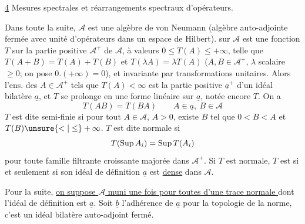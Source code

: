 \uline{4} Mesures spectrales et réarrangements spectraux d'opérateurs.

Dans toute la suite, $\mathcal A$ est une algèbre de von Neumann (algèbre auto-adjointe  fermée  avec unité d'opérateurs dans un espace de Hilbert).   sur $\mathcal A$ est une  fonction $T$ sur la partie positive $\mathcal A^+$ de $\mathcal A$, à valeurs $0\leq T(A)\leq+\infty$,  telle que $T(A+B)=T(A)+T(B)$ et $T(\lambda A)=\lambda T(A)$ ($A,B\in\mathcal A^+$, $\lambda$  scalaire $\geq0$; on pose $0.(+\infty)=0$), et invariante par transformations unitaires. Alors l'ens. des $A\in\mathcal A^+$ tels que $T(A)<\infty$ est la partie positive $\underline a^+$ d'un idéal bilatère  $\underline a$,  et $T$ se prolonge en une forme linéaire sur $\underline a$, notée encore $T$. On a
\[
T(AB)=T(BA)\qquad A\in\underline a,\ B\in\mathcal A
\]
$T$ est dite  semi-finie si pour tout  $A\in\mathcal A$, $A>0$, existe $B$ tel que $0<B<A$ et $T(B)\unsure{<|\leq}+\infty$. $T$ est dite normale si
\[
T(\mathop{\rm Sup} A_i)=\mathop{\rm Sup} T(A_i)
\]
pour toute famille filtrante croissante majorée  dans $\mathcal A^+$. Si $T$ est normale, $T$ est   si et seulement si  son idéal de définition $\underline a$ est \uline{ dense} dans $\mathcal A$.


Pour la suite, \uline{on suppose $\mathcal A$ muni une fois pour toutes d'une trace normale   } dont l'idéal de définition est $\underline a$. Soit $\underline b$ l'adhérence de $\underline a$ pour la topologie de la norme, c'est un idéal bilatère auto-adjoint  fermé.
